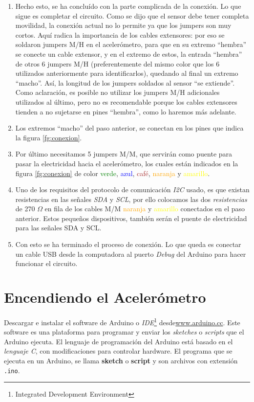 \documentclass[10pt, a4paper, twocolumn]{article} %
\begin{document}
\begin{enumerate}
	\item Hecho esto, se ha concluído con la parte complicada de la conexión. Lo que sigue es completar el circuito. Como se dijo que el sensor debe tener completa movilidad, la conexión actual no lo permite ya que los jumpers son muy cortos. Aquí radica la importancia de los cables extensores: por eso se soldaron jumpers M/H en el acelerómetro, para que en su extremo ``hembra'' se conecte un cable extensor, y en el extremo de estos, la entrada ``hembra'' de otros 6 jumpers M/H (preferentemente del mismo color que los 6 utilizados anteriormente para identificarlos), quedando al final un extremo ``macho''. Así, la longitud de los jumpers soldados al sensor ``se extiende''. Como aclaración, es posible no utilizar los jumpers M/H adicionales utilizados al último, pero no es recomendable porque los cables extensores tienden a no sujetarse en pines ``hembra'', como lo haremos más adelante.
	\item Los extremos ``macho'' del paso anterior, se conectan en los pines que indica la figura \ref{fg:conexion}.
	\item Por último necesitamos 5 jumpers M/M, que servirán como puente para pasar la electricidad hacia el acelerómetro, los cuales están indicados en la figura \ref{fg:conexion} de color \textcolor{green}{verde}, \textcolor{blue}{azul}, \textcolor{brown}{café}, \textcolor{orange}{naranja} y \textcolor{yellow}{amarillo}.
    \item Uno de los requisitos del protocolo de comunicación \textit{I2C} usado, es que existan resistencias en las señales \textit{SDA} y \textit{SCL}, por ello colocamos las dos \textit{resistencias} de 270 $\Omega$ en fila de los cables M/M \textcolor{orange}{naranja} y \textcolor{yellow}{amarillo} conectados en el paso anterior. Estos pequeños dispositivos, también serán el puente de electricidad para las señales SDA y SCL.
    \item Con esto se ha terminado el proceso de conexión. Lo que queda es conectar un cable USB desde la computadora al puerto \textit{Debug} del Arduino para hacer funcionar el circuito.
\end{enumerate}

\section{Encendiendo el Acelerómetro}

Descargar e instalar el software de Arduino o \textit{IDE}\footnote{Integrated Development Environment} desde\url{www.arduino.cc}. Este software es una plataforma para programar y enviar los \textit{sketches} o \textit{scripts} que el Arduino ejecuta. El lenguaje de programación del Arduino está basado en el \textit{lenguaje C}, con modificaciones para controlar hardware. El programa que se ejecuta en un Arduino, se llama \textbf{sketch} o \textbf{script} y son archivos con extensión \texttt{.ino}.
\end{document}

